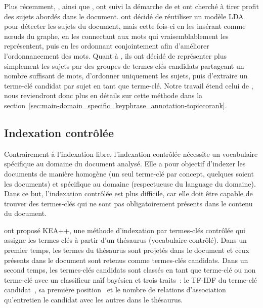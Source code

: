     Plus récemment, , ainsi que
    , ont suivi la démarche de
     et ont cherché à tirer profit des sujets
    abordés dans le document.  ont décidé
    de réutiliser un modèle LDA pour détecter les sujets du document, mais cette
    fois-ci en les insérant comme n\oe{}uds du graphe, en les connectant aux
    mots qui vraisemblablement les représentent, puis en les ordonnant
    conjointement afin d'améliorer l'ordonnancement des mots.
    Quant à , ils ont décidé de
    représenter plus simplement les sujets par des groupes de termes-clés
    candidats partageant un nombre suffisant de mots, d'ordonner uniquement les
    sujets, puis d'extraire un terme-clé candidat par sujet en tant que
    terme-clé. Notre travail étend celui de ,
    nous reviendront donc plus en détails sur cette méthode dans la
    section~\ref{sec:main-domain_specific_keyphrase_annotation-topiccorank}.

  \subsection{Indexation contrôlée}
  \label{subsec:main-domain_specific_keyphrase_annotation-state_of_the_art-keyphrase_extraction}
    Contrairement à l'indexation libre, l'indexation contrôlée nécessite un
    vocabulaire spécifique au domaine du document analysé. Elle a pour objectif
    d'indexer les documents de manière homogène (un seul terme-clé par concept,
    quelques soient les documents) et spécifique au domaine (respectueuse du
    language du domaine). Dans ce but,
    l'indexation contrôlée est plus difficile, car elle doit être capable de
    trouver des termes-clés qui ne sont pas obligatoirement présents dans le
    contenu du document.

     ont proposé KEA++, une méthode d'indexation par
    termes-clés contrôlée qui assigne les termes-clés à partir d'un thésaurus
    (vocabulaire contrôlé).
    Dans un premier temps, les termes du thésaurus sont projetés dans le
    document et ceux présents dans le document sont retenus comme termes-clés
    candidats. Dans un second temps, les termes-clés candidats sont classés en
    tant que \og{}terme-clé\fg{} ou \og{}non terme-clé\fg{} avec un classifieur
    naïf bayésien et trois traits~: le TF-IDF du terme-clé
    candidat~\cite{witten1999kea}, sa première position~\cite{witten1999kea} et
    le nombre de relations d'association qu'entretien le candidat avec les
    autres dans le thésaurus.

